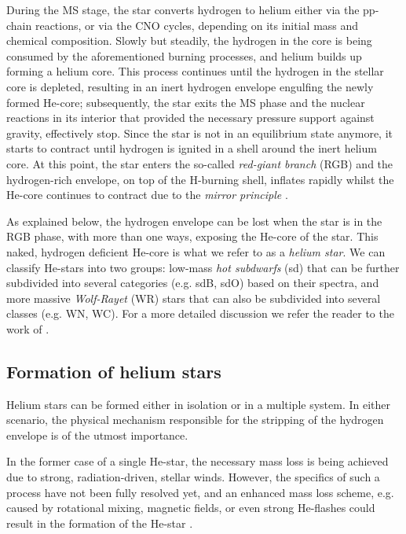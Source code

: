 \documentclass[../../main/thesis_msc.tex]{subfiles}
\begin{document}
    	During the MS stage, the star converts hydrogen to helium either via the pp-chain reactions, or via the CNO cycles, depending on its initial mass and chemical composition. Slowly but steadily, the hydrogen in the core is being consumed by the aforementioned burning processes, and helium builds up forming a helium core. This process continues until the hydrogen in the stellar core is depleted, resulting in an inert hydrogen envelope engulfing the newly formed He-core; subsequently, the star exits the MS phase and the nuclear reactions in its interior that provided the necessary pressure support against gravity, effectively stop. Since the star is not in an equilibrium state anymore, it starts to contract until hydrogen is ignited in a shell around the inert helium core. At this point, the star enters the so-called \emph{red-giant branch} (RGB) and the hydrogen-rich envelope, on top of the H-burning shell, inflates rapidly whilst the He-core continues to contract due to the \emph{mirror principle} \citep[see][p.~369]{Kipp_book}.
    	
    	As explained below, the hydrogen envelope can be lost when the star is in the RGB phase, with more than one ways, exposing the He-core of the star. This naked, hydrogen deficient He-core is what we refer to as a \emph{helium star}. We can classify He-stars into two groups: low-mass \emph{hot subdwarfs} (sd) that can be further subdivided into several categories (e.g. sdB, sdO) based on their spectra, and more massive \emph{Wolf-Rayet} (WR) stars that can also be subdivided into several classes (e.g. WN, WC). For a more detailed discussion we refer the reader to the work of \cite{Han2002, Han2003, Heber2009, Chiosi86, langer12}.


			\subsection{Formation of helium stars}
			
				Helium stars can be formed either in isolation or in a multiple system. In either scenario, the physical mechanism responsible for the stripping of the hydrogen envelope is of the utmost importance.
				
				In the former case of a single He-star, the necessary mass loss is being achieved due to strong, radiation-driven, stellar winds. However, the specifics of such a process have not been fully resolved yet, and an enhanced mass loss scheme, e.g. caused by rotational mixing, magnetic fields, or even strong He-flashes could result in the formation of the He-star \citep{Sweigart, Heber2009}. 
				
\end{document}
